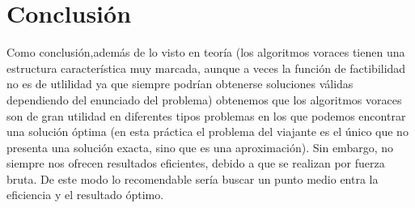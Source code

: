 \documentclass[11pt,openany]{book}
\begin{document}
\chapter{Conclusión}
Como conclusión,además de lo visto en teoría (los algoritmos voraces tienen una 
estructura característica muy marcada, aunque a veces la función de factibilidad 
no es de utlilidad ya que siempre podrían obtenerse soluciones válidas dependiendo 
del enunciado del problema) obtenemos que los algoritmos voraces son de gran 
utilidad en diferentes tipos problemas en los que podemos encontrar una solución 
óptima (en esta práctica el problema del viajante es el único que no presenta 
una solución exacta, sino que es una aproximación). Sin embargo, no siempre 
nos ofrecen resultados eficientes, debido a que se realizan por fuerza bruta. 
De este modo lo recomendable sería buscar un punto medio entra la eficiencia 
y el resultado óptimo.
\end{document}
